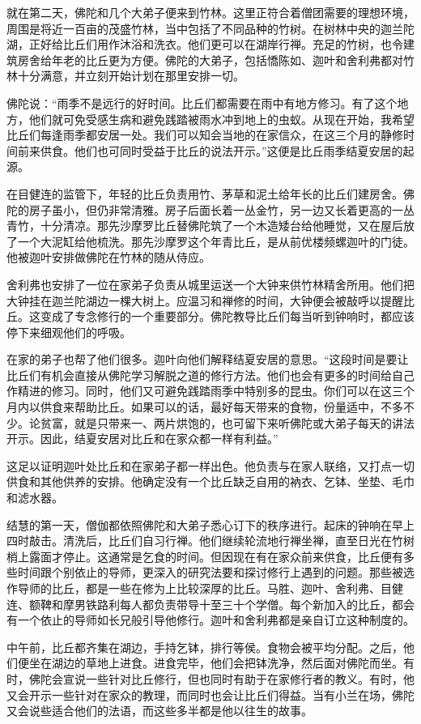 \documentclass[12pt,twoside,openany]{book}
\begin{document}
就在第二天，佛陀和几个大弟子便来到竹林。这里正符合着僧团需要的理想环境，周围是将近一百亩的茂盛竹林，当中包括了不同品种的竹树。在树林中央的迦兰陀湖，正好给比丘们用作沐浴和洗衣。他们更可以在湖岸行禅。充足的竹树，也令建筑房舍给年老的比丘更为方便。佛陀的大弟子，包括憍陈如、迦叶和舍利弗都对竹林十分满意，并立刻开始计划在那里安排一切。

佛陀说：“雨季不是远行的好时间。比丘们都需要在雨中有地方修习。有了这个地方，他们就可免受感生病和避免践踏被雨水冲到地上的虫蚁。从现在开始，我希望比丘们每逢雨季都安居一处。我们可以知会当地的在家信众，在这三个月的静修时间前来供食。他们也可同时受益于比丘的说法开示。”这便是比丘雨季结夏安居的起源。

在目健连的监管下，年轻的比丘负责用竹、茅草和泥土给年长的比丘们建房舍。佛陀的房子虽小，但仍非常清雅。房子后面长着一丛金竹，另一边又长着更高的一丛青竹，十分清凉。那先沙摩罗比丘替佛陀筑了一个木造矮台给他睡觉，又在屋后放了一个大泥缸给他梳洗。那先沙摩罗这个年青比丘，是从前优楼频螺迦叶的门徒。他被迦叶安排做佛陀在竹林的随从侍应。

舍利弗也安排了一位在家弟子负责从城里运送一个大钟来供竹林精舍所用。他们把大钟挂在迦兰陀湖边一棵大树上。应温习和禅修的时间，大钟便会被敲呼以提醒比丘。这变成了专念修行的一个重要部分。佛陀教导比丘们每当听到钟响时，都应该停下来细观他们的呼吸。

在家的弟子也帮了他们很多。迦叶向他们解释结夏安居的意思。“这段时间是要让比丘们有机会直接从佛陀学习解脱之道的修行方法。他们也会有更多的时间给自己作精进的修习。同时，他们又可避免践踏雨季中特别多的昆虫。你们可以在这三个月内以供食来帮助比丘。如果可以的话，最好每天带来的食物，份量适中，不多不少。论贫富，就是只带来一、两片烘饱的，也可留下来听佛陀或大弟子每天的讲法开示。因此，结夏安居对比丘和在家众都一样有利益。”

这足以证明迦叶处比丘和在家弟子都一样出色。他负责与在家人联络，又打点一切供食和其他供养的安排。他确定没有一个比丘缺乏自用的衲衣、乞钵、坐垫、毛巾和滤水器。

结慧的第一天，僧伽都依照佛陀和大弟子悉心订下的秩序进行。起床的钟响在早上四时敲击。清洗后，比丘们自习行禅。他们继续轮流地行禅坐禅，直至日光在竹树梢上露面才停止。这通常是乞食的时间。但因现在有在家众前来供食，比丘便有多些时间跟个别依止的导师，更深入的研究法要和探讨修行上遇到的问题。那些被选作导师的比丘，都是一些在修为上比较深厚的比丘。马胜、迦叶、舍利弗、目健连、额鞞和摩男铁路利每人都负责带导十至三十个学僧。每个新加入的比丘，都会有一个依止的导师如长兄般引导他修行。迦叶和舍利弗都是亲自订立这种制度的。

中午前，比丘都齐集在湖边，手持乞钵，排行等侯。食物会被平均分配。之后，他们便坐在湖边的草地上进食。进食完毕，他们会把钵洗净，然后面对佛陀而坐。有时，佛陀会宣说一些针对比丘修行，但也同时有助于在家修行者的教义。有时，他又会开示一些针对在家众的教理，而同时也会让比丘们得益。当有小兰在场，佛陀又会说些适合他们的法语，而这些多半都是他以往生的故事。
\end{document}
